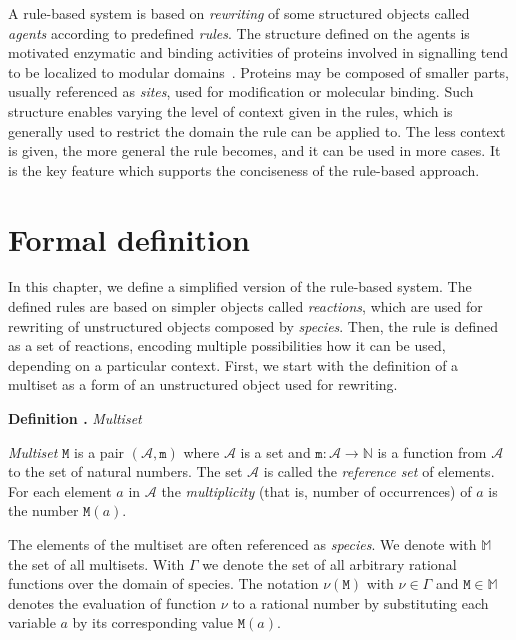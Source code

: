 \documentclass[11pt,a4paper]{report}
\newcounter{counter}[section]
\renewcommand{\thecounter}{\thechapter.\arabic{counter}}
\newenvironment{definition}[1]{\bigskip\refstepcounter{counter}\noindent\textbf{Definition \thecounter } \emph{#1} \par\nopagebreak\noindent \begin{itshape}}{\end{itshape}\bigskip}
\begin{document}
A rule-based system is based on \emph{rewriting} of some structured objects called \emph{agents} according to predefined \emph{rules}. The structure defined on the agents is motivated enzymatic and binding activities of proteins involved in signalling tend to be localized to modular domains~\cite{pawson2003assembly}. Proteins may be composed of smaller parts, usually referenced as \emph{sites}, used for modification or molecular binding. Such structure enables varying the level of context given in the rules, which is generally used to restrict the domain the rule can be applied to. The less context is given, the more general the rule becomes, and it can be used in more cases. It is the key feature which supports the conciseness of the rule-based approach.

\section{Formal definition}

In this chapter, we define a simplified version of the rule-based system. The defined rules are based on simpler objects called \emph{reactions}, which are used for rewriting of unstructured objects composed by \emph{species}. Then, the rule is defined as a set of reactions, encoding multiple possibilities how it can be used, depending on a particular context. First, we start with the definition of a multiset as a form of an unstructured object used for rewriting.

\begin{definition}{Multiset}
\emph{Multiset} $\mathtt{M}$ is a pair $(\mathcal{A}, \mathtt{m})$ where $\mathcal{A}$ is a set and $ \mathtt{m} : \mathcal{A} \rightarrow \mathbb{N} $ is a function from $\mathcal{A}$ to the set of natural numbers. The set $\mathcal{A}$ is called the \emph{reference set} of elements. For each element $\mathit{a}$ in $\mathcal{A}$ the \emph{multiplicity} (that is, number of occurrences) of $\mathit{a}$ is the number $\mathtt{M}(\mathit{a})$.
\end{definition}

The elements of the multiset are often referenced as \emph{species}. We denote with $\mathbb{M}$ the set of all multisets. With $\Gamma$ we denote the set of all arbitrary rational functions over the domain of species. The notation $\nu(\mathtt{M})$ with $\nu \in \Gamma$ and $\mathtt{M} \in \mathbb{M}$ denotes the evaluation of function $\nu$ to a rational number by substituting each variable $\mathit{a}$ by its corresponding value $\mathtt{M}(\mathit{a})$.
\end{document}
